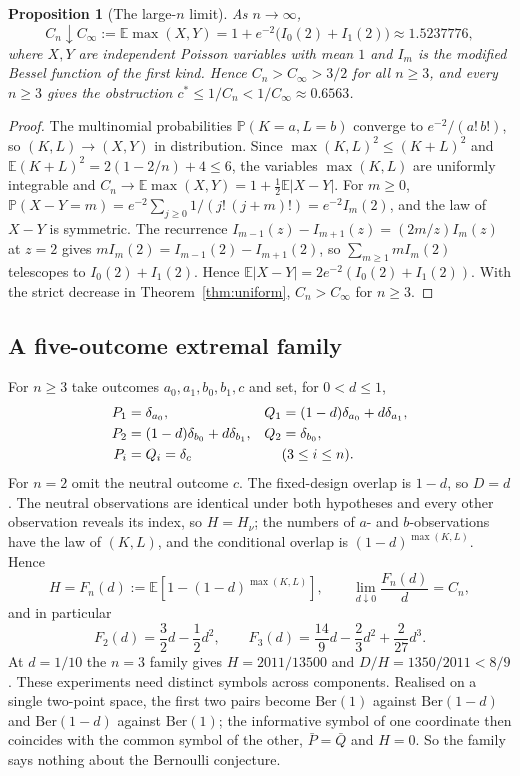 \documentclass[11pt,a4paper]{article}
\newtheorem{proposition}[theorem]{Proposition}
\theoremstyle{definition}\newtheorem{definition}[theorem]{Definition}
\theoremstyle{remark}\newtheorem{remark}[theorem]{Remark}
\newcommand{\E}{\mathbb E}
\newcommand{\PP}{\mathbb P}
\begin{document}
\begin{proposition}[The large-$n$ limit]\label{prop:limit}
As $n\to\infty$,
\[
C_n\downarrow C_\infty:=\E\max(X,Y)=1+e^{-2}\bigl(I_0(2)+I_1(2)\bigr)\approx1.5237776,
\]
where $X,Y$ are independent Poisson variables with mean $1$ and $I_m$ is the modified Bessel function of the first kind. Hence $C_n>C_\infty>3/2$ for all $n\ge3$, and every $n\ge3$ gives the obstruction $c^*\le1/C_n<1/C_\infty\approx0.6563$.
\end{proposition}
\begin{proof}
The multinomial probabilities $\PP(K=a,L=b)$ converge to $e^{-2}/(a!\,b!)$, so $(K,L)\to(X,Y)$ in distribution. Since $\max(K,L)^2\le(K+L)^2$ and $\E(K+L)^2=2(1-2/n)+4\le6$, the variables $\max(K,L)$ are uniformly integrable and $C_n\to\E\max(X,Y)=1+\frac12\E|X-Y|$. For $m\ge0$, $\PP(X-Y=m)=e^{-2}\sum_{j\ge0}1/(j!\,(j+m)!)=e^{-2}I_m(2)$, and the law of $X-Y$ is symmetric. The recurrence $I_{m-1}(z)-I_{m+1}(z)=(2m/z)I_m(z)$ at $z=2$ gives $mI_m(2)=I_{m-1}(2)-I_{m+1}(2)$, so $\sum_{m\ge1}mI_m(2)$ telescopes to $I_0(2)+I_1(2)$. Hence $\E|X-Y|=2e^{-2}(I_0(2)+I_1(2))$. With the strict decrease in Theorem~\ref{thm:uniform}, $C_n>C_\infty$ for $n\ge3$.
\end{proof}

\subsection{A five-outcome extremal family}\label{sec:five}
For $n\ge3$ take outcomes $a_0,a_1,b_0,b_1,c$ and set, for $0<d\le1$,
\begin{align}\label{eq:five}
P_1&=\delta_{a_0},& Q_1&=(1-d)\delta_{a_0}+d\delta_{a_1},\notag\\
P_2&=(1-d)\delta_{b_0}+d\delta_{b_1},& Q_2&=\delta_{b_0},\\
P_i&=Q_i=\delta_c&& (3\le i\le n).\notag
\end{align}
For $n=2$ omit the neutral outcome $c$. The fixed-design overlap is $1-d$, so $D=d$. The neutral observations are identical under both hypotheses and every other observation reveals its index, so $H=H_\nu$; the numbers of $a$- and $b$-observations have the law of $(K,L)$, and the conditional overlap is $(1-d)^{\max(K,L)}$. Hence
\begin{equation}\label{eq:Fn}
 H=F_n(d):=\E\left[1-(1-d)^{\max(K,L)}\right],\qquad
 \lim_{d\downarrow0}\frac{F_n(d)}d=C_n,
\end{equation}
and in particular
\begin{equation}\label{eq:F2F3}
F_2(d)=\frac32d-\frac12d^2,\qquad
F_3(d)=\frac{14}{9}d-\frac23d^2+\frac{2}{27}d^3.
\end{equation}
At $d=1/10$ the $n=3$ family gives $H=2011/13500$ and $D/H=1350/2011<8/9$. These experiments need distinct symbols across components. Realised on a single two-point space, the first two pairs become $\mathrm{Ber}(1)$ against $\mathrm{Ber}(1-d)$ and $\mathrm{Ber}(1-d)$ against $\mathrm{Ber}(1)$; the informative symbol of one coordinate then coincides with the common symbol of the other, $\bar P=\bar Q$ and $H=0$. So the family says nothing about the Bernoulli conjecture.
\end{document}
